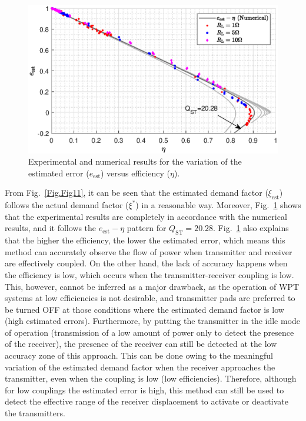 \documentclass[journal,a4paper]{IEEEtran}
\begin{document}
\begin{figure}[t!]
\begin{center}
	\includegraphics[clip, trim=1cm 0.0cm 1cm 0.0cm, width=1\columnwidth]{Figs/Fig14.eps}
\end{center}
\vspace{-0.1cm}
	\caption{Experimental and numerical results for the variation of the estimated error ($e_{\mathrm{est}}$) versus efficiency ($\eta$).}
		\label{Fig.Fig14}
		\vspace{-3mm}
\end{figure}
From Fig.~\ref{Fig.Fig11}, it can be seen that the estimated demand factor ($\xi_{\mathrm{est}}$) follows the actual demand factor ($\xi^*$) in a reasonable way. Moreover, Fig.~\ref{Fig.Fig14} shows that the experimental results are completely in accordance with the numerical results, and it follows the $e_{\mathrm{est}}-\eta$ pattern for $Q_{\mathrm{ST}}=20.28$.
Fig.~\ref{Fig.Fig14} also explains that the higher the efficiency, the lower the estimated error, which means this method can accurately observe the flow of power when transmitter and receiver are effectively coupled. On the other hand, the lack of accuracy happens when the efficiency is low, which occurs when the transmitter-receiver coupling is low. This, however, cannot be inferred as a major drawback, as the operation of WPT systems at low efficiencies is not desirable, and transmitter pads are preferred to be turned OFF at those conditions where the estimated demand factor is low (high estimated errors). Furthermore, by putting the transmitter in the idle mode of operation (transmission of a low amount of power only to detect the presence of the receiver), the presence of the receiver can still be detected at the low accuracy zone of this approach. This can be done owing to the meaningful variation of the estimated demand factor when the receiver approaches the transmitter, even when the coupling is low (low efficiencies). Therefore, although for low couplings the estimated error is high, this method can still be used to detect the effective range of the receiver displacement to activate or deactivate the transmitters.
\end{document}
